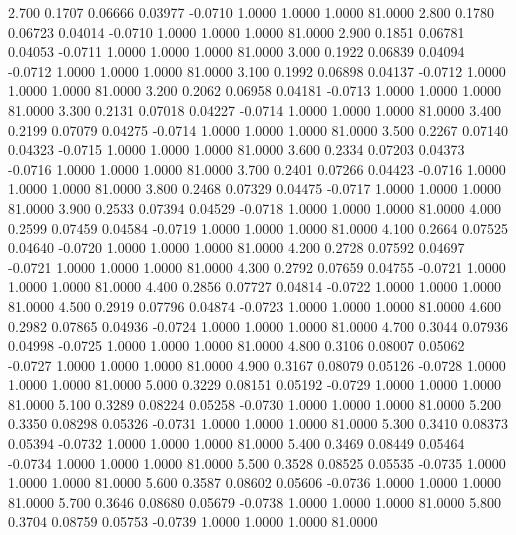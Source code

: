    2.700   0.1707   0.06666   0.03977  -0.0710   1.0000   1.0000   1.0000  81.0000
   2.800   0.1780   0.06723   0.04014  -0.0710   1.0000   1.0000   1.0000  81.0000
   2.900   0.1851   0.06781   0.04053  -0.0711   1.0000   1.0000   1.0000  81.0000
   3.000   0.1922   0.06839   0.04094  -0.0712   1.0000   1.0000   1.0000  81.0000
   3.100   0.1992   0.06898   0.04137  -0.0712   1.0000   1.0000   1.0000  81.0000
   3.200   0.2062   0.06958   0.04181  -0.0713   1.0000   1.0000   1.0000  81.0000
   3.300   0.2131   0.07018   0.04227  -0.0714   1.0000   1.0000   1.0000  81.0000
   3.400   0.2199   0.07079   0.04275  -0.0714   1.0000   1.0000   1.0000  81.0000
   3.500   0.2267   0.07140   0.04323  -0.0715   1.0000   1.0000   1.0000  81.0000
   3.600   0.2334   0.07203   0.04373  -0.0716   1.0000   1.0000   1.0000  81.0000
   3.700   0.2401   0.07266   0.04423  -0.0716   1.0000   1.0000   1.0000  81.0000
   3.800   0.2468   0.07329   0.04475  -0.0717   1.0000   1.0000   1.0000  81.0000
   3.900   0.2533   0.07394   0.04529  -0.0718   1.0000   1.0000   1.0000  81.0000
   4.000   0.2599   0.07459   0.04584  -0.0719   1.0000   1.0000   1.0000  81.0000
   4.100   0.2664   0.07525   0.04640  -0.0720   1.0000   1.0000   1.0000  81.0000
   4.200   0.2728   0.07592   0.04697  -0.0721   1.0000   1.0000   1.0000  81.0000
   4.300   0.2792   0.07659   0.04755  -0.0721   1.0000   1.0000   1.0000  81.0000
   4.400   0.2856   0.07727   0.04814  -0.0722   1.0000   1.0000   1.0000  81.0000
   4.500   0.2919   0.07796   0.04874  -0.0723   1.0000   1.0000   1.0000  81.0000
   4.600   0.2982   0.07865   0.04936  -0.0724   1.0000   1.0000   1.0000  81.0000
   4.700   0.3044   0.07936   0.04998  -0.0725   1.0000   1.0000   1.0000  81.0000
   4.800   0.3106   0.08007   0.05062  -0.0727   1.0000   1.0000   1.0000  81.0000
   4.900   0.3167   0.08079   0.05126  -0.0728   1.0000   1.0000   1.0000  81.0000
   5.000   0.3229   0.08151   0.05192  -0.0729   1.0000   1.0000   1.0000  81.0000
   5.100   0.3289   0.08224   0.05258  -0.0730   1.0000   1.0000   1.0000  81.0000
   5.200   0.3350   0.08298   0.05326  -0.0731   1.0000   1.0000   1.0000  81.0000
   5.300   0.3410   0.08373   0.05394  -0.0732   1.0000   1.0000   1.0000  81.0000
   5.400   0.3469   0.08449   0.05464  -0.0734   1.0000   1.0000   1.0000  81.0000
   5.500   0.3528   0.08525   0.05535  -0.0735   1.0000   1.0000   1.0000  81.0000
   5.600   0.3587   0.08602   0.05606  -0.0736   1.0000   1.0000   1.0000  81.0000
   5.700   0.3646   0.08680   0.05679  -0.0738   1.0000   1.0000   1.0000  81.0000
   5.800   0.3704   0.08759   0.05753  -0.0739   1.0000   1.0000   1.0000  81.0000
